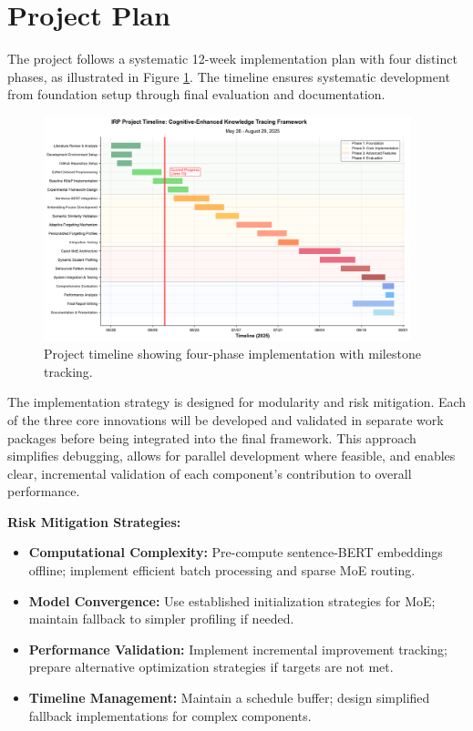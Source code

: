 \documentclass[project-plan]{report-template}
\begin{document}
\section{Project Plan}

The project follows a systematic 12-week implementation plan with four distinct phases, as illustrated in Figure \ref{fig:gantt_timeline}. The timeline ensures systematic development from foundation setup through final evaluation and documentation.

\begin{figure}[p]
    \centering
    \includegraphics[angle=90, width=0.95\textwidth]{project_gantt_chart.png}
    \caption{Project timeline showing four-phase implementation with milestone tracking.}
    \label{fig:gantt_timeline}
\end{figure}

The implementation strategy is designed for modularity and risk mitigation. Each of the three core innovations will be developed and validated in separate work packages before being integrated into the final framework. This approach simplifies debugging, allows for parallel development where feasible, and enables clear, incremental validation of each component's contribution to overall performance.

\textbf{Risk Mitigation Strategies:}
\begin{itemize}
    \item \textbf{Computational Complexity:} Pre-compute sentence-BERT embeddings offline; implement efficient batch processing and sparse MoE routing.
    \item \textbf{Model Convergence:} Use established initialization strategies for MoE; maintain fallback to simpler profiling if needed.
    \item \textbf{Performance Validation:} Implement incremental improvement tracking; prepare alternative optimization strategies if targets are not met.
    \item \textbf{Timeline Management:} Maintain a schedule buffer; design simplified fallback implementations for complex components.
\end{itemize}
\end{document}
